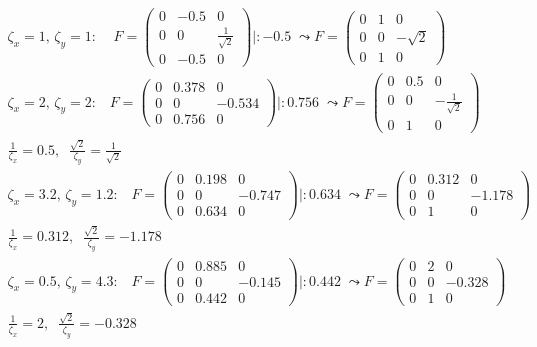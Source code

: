 \begin{gather*}
	\zeta_x = 1, \, \zeta_y = 1: \; \; \;\;
	F = \begin{pmatrix}
			0&-0.5&0\\
			0&0&\frac{1}{\sqrt{2}}\\
			0&-0.5&0
		\end{pmatrix} |: -0.5 \; \leadsto
	F=\begin{pmatrix}
		0&1&0\\
		0&0&-\sqrt{2}\\
		0&1&0
	\end{pmatrix}\\	
	\zeta_x = 2, \, \zeta_y = 2: \; \; \;
	F = \begin{pmatrix}
		0&0.378&0\\
		0&0&-0.534\\
		0&0.756&0
	\end{pmatrix} |: 0.756 \; \leadsto
	F=\begin{pmatrix}
		0&0.5&0\\
		0&0&-\frac{1}{\sqrt{2}}\\
		0&1&0
	\end{pmatrix}\\ \frac{1}{\zeta_x} = 0.5, \;\; \frac{\sqrt{2}}{\zeta_y} = \frac{1}{\sqrt{2}}\\
	\zeta_x = 3.2, \, \zeta_y = 1.2: \; \; \;
F = \begin{pmatrix}
	0&0.198&0\\
	0&0&-0.747\\
	0&0.634&0
\end{pmatrix} |: 0.634 \; \leadsto
F=\begin{pmatrix}
	0&0.312&0\\
	0&0&-1.178\\
	0&1&0
\end{pmatrix}\\ \frac{1}{\zeta_x} = 0.312, \;\; \frac{\sqrt{2}}{\zeta_y} = -1.178\\
	\zeta_x = 0.5, \, \zeta_y = 4.3: \; \; \;
F = \begin{pmatrix}
	0&0.885&0\\
	0&0&-0.145\\
	0&0.442&0
\end{pmatrix} |: 0.442 \; \leadsto
F=\begin{pmatrix}
	0&2&0\\
	0&0&-0.328\\
	0&1&0
\end{pmatrix}\\ \frac{1}{\zeta_x} =2, \;\; \frac{\sqrt{2}}{\zeta_y} = -0.328
\end{gather*}\\


